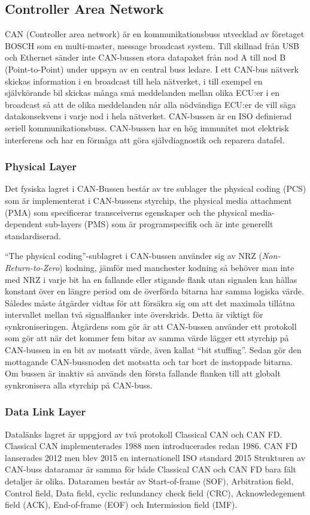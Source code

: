 \documentclass[a4paper]{IEEEtran}
\begin{document}
\subsection{Controller Area Network} \label{sec:CAN}
CAN (Controller area network) är en kommunikationsbuss utvecklad av företaget BOSCH som en multi-master, message broadcast system. Till skillnad från USB och Ethernet sänder inte CAN-bussen stora datapaket från nod A till nod B (Point-to-Point) under uppsyn av en central buss ledare. I ett CAN-bus nätverk skickas information i en broadcast till hela nätverket, i till exempel en självkörande bil skickas många små meddelanden mellan olika ECU:er i en broadcast så att de olika meddelanden når alla nödvändiga ECU:er de vill säga datakonsekvens i varje nod i hela nätverket. CAN-bussen är en ISO definierad seriell kommunikationsbuss. CAN-bussen har en hög immunitet mot elektrisk interferens och har en förmåga att göra självdiagnostik och reparera datafel. \cite{CANintr}

\subsubsection{Physical Layer}
Det fysiska lagret i CAN-Bussen består av tre sublager the physical coding (PCS) som är implementerat i CAN-bussens styrchip, the physical media attachment (PMA) som specificerar transceiverns egenskaper och the physical media-dependent sub-layers (PMS) som är programspecifik och är inte generellt standardiserad.

``The physical coding''-sublagret i CAN-bussen använder sig av NRZ (\emph{Non-Return-to-Zero}) kodning, jämför med manchester kodning så behöver man inte med NRZ i varje bit ha en fallande eller stigande flank utan signalen kan hållas konstant över en längre period om de överförda bitarna har samma logiska värde. Således måste åtgärder vidtas för att försäkra sig om att det maximala tillåtna intervallet mellan två signalflanker inte överskrids. Detta är viktigt för synkroniseringen. Åtgärdens som gör är att CAN-bussen använder ett protokoll som gör att när det kommer fem bitar av samma värde lägger ett styrchip på CAN-bussen in en bit av motsatt värde, även kallat ``bit stuffing''. Sedan gör den mottagande CAN-bussnoden det motsatta och tar bort de instoppade bitarna.
Om bussen är inaktiv så används den första fallande flanken till att globalt synkronisera alla styrchip på CAN-buss. \cite{CANphys}

\subsubsection{Data Link Layer}
Datalänks lagret är uppgjord av två protokoll Classical CAN och CAN FD. Classical CAN implementerades 1988 men introducerades redan 1986. CAN FD lanserades 2012 men blev 2015 en internationell ISO standard 2015 Strukturen av CAN-buss dataramar är samma för både Classical CAN och CAN FD bara fält detaljer är olika. Dataramen består av Start-of-frame (SOF), Arbitration field, Control field, Data field, cyclic redundancy check field (CRC), Acknowledegement field (ACK), End-of-frame (EOF) och Intermission field (IMF). 
\end{document}
